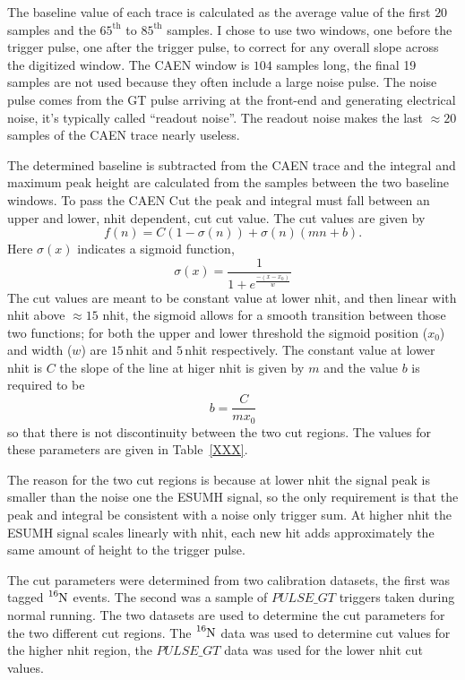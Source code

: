 The baseline value of each trace is calculated as the average value of the first
$20$ samples and the $65^{\text{th}}$ to $85^{\text{th}}$ samples.
I chose to use two windows, one before the trigger pulse, one after the trigger pulse, to
correct for any overall slope across the digitized window.
The CAEN window is $104$ samples long, the final 19 samples are not used because they often
include a large noise pulse.
The noise pulse comes from the GT pulse arriving at the front-end and generating electrical noise,
it's typically called ``readout noise''.
The readout noise makes the last $\approx20$ samples of the CAEN trace nearly
useless.

The determined baseline is subtracted from the CAEN trace and the integral and maximum
peak height are calculated from the samples between the two baseline windows.
To pass the CAEN Cut the peak and integral must fall between an upper and lower, nhit dependent,
cut cut value.
The cut values are given by
\begin{equation}
    f(n) = C\left(1-\sigma(n)\right) + \sigma(n)\left(mn+b\right)\text{.}
    \label{eqn:cc_threshold}
\end{equation}
Here $\sigma(x)$ indicates a sigmoid function,
\begin{equation}
    \sigma(x) = \frac{1}{1+e^{\frac{-(x-x_{0})}{w}}}
\end{equation}
The cut values are meant to be constant value at lower nhit, and then
linear with nhit above $\approx15$ nhit, the sigmoid allows for a smooth
transition between those two functions; for both the upper and lower threshold
the sigmoid position ($x_{0}$) and width ($w$) are $15$\,nhit and $5$\,nhit respectively.
The constant value at lower nhit is $C$ the slope of the line at higer nhit
is given by $m$ and the value $b$ is required to be
\begin{equation}
    b = \frac{C}{mx_{0}}
\end{equation}
so that there is not discontinuity between the two cut regions.
The values for these parameters are given in Table~\ref{XXX}.

The reason for the two cut regions is because at lower nhit the signal
peak is smaller than the noise one the ESUMH signal, so the only requirement
is that the peak and integral be consistent with a noise only trigger sum.
At higher nhit the ESUMH signal scales linearly with nhit, each new hit
adds approximately the same amount of height to the trigger pulse.

The cut parameters were determined from two calibration datasets, the first was
tagged $\ce{^{16}N}$
events. The second was a sample of $PULSE\_GT$ triggers taken during normal
running.
The two datasets are used to determine the cut parameters for the two
different cut regions.
The $\ce{^{16}N}$ data was used to determine cut values for the higher nhit
region, the $PULSE\_GT$ data was used for the lower nhit cut values.

